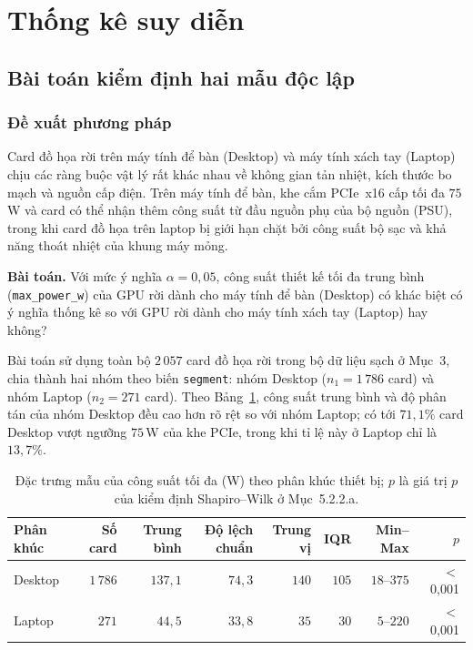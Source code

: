 \documentclass[12pt, a4paper]{article}
\begin{document}
\setcounter{section}{4}
\section{Thống kê suy diễn}
\setcounter{subsection}{1}
\subsection{Bài toán kiểm định hai mẫu độc lập}

\subsubsection{Đề xuất phương pháp}
Card đồ họa rời trên máy tính để bàn (Desktop) và máy tính xách tay (Laptop) chịu các ràng buộc vật lý rất khác nhau về không gian tản nhiệt, kích thước bo mạch và nguồn cấp điện. Trên máy tính để bàn, khe cắm PCIe~x16 cấp tối đa $75$\,W và card có thể nhận thêm công suất từ đầu nguồn phụ của bộ nguồn (PSU), trong khi card đồ họa trên laptop bị giới hạn chặt bởi công suất bộ sạc và khả năng thoát nhiệt của khung máy mỏng.

\textbf{Bài toán.} Với mức ý nghĩa $\alpha = 0{,}05$, công suất thiết kế tối đa trung bình (\texttt{max\_power\_w}) của GPU rời dành cho máy tính để bàn (Desktop) có khác biệt có ý nghĩa thống kê so với GPU rời dành cho máy tính xách tay (Laptop) hay không?

Bài toán sử dụng toàn bộ $2\,057$ card đồ họa rời trong bộ dữ liệu sạch ở Mục~3, chia thành hai nhóm theo biến \texttt{segment}: nhóm Desktop ($n_1 = 1\,786$ card) và nhóm Laptop ($n_2 = 271$ card). Theo Bảng~\ref{tab:two_sample_groups}, công suất trung bình và độ phân tán của nhóm Desktop đều cao hơn rõ rệt so với nhóm Laptop; có tới $71{,}1\%$ card Desktop vượt ngưỡng $75$\,W của khe PCIe, trong khi tỉ lệ này ở Laptop chỉ là $13{,}7\%$.

\begin{table}[H]
  \centering
  \caption{Đặc trưng mẫu của công suất tối đa (W) theo phân khúc thiết bị; $p$ là giá trị $p$ của kiểm định Shapiro--Wilk ở Mục~5.2.2.a.}
  \label{tab:two_sample_groups}
  \begin{tabular}{lrrrrrrr}
    \toprule
    Phân khúc & Số card & Trung bình & Độ lệch chuẩn & Trung vị & IQR & Min--Max & $p$ \\
    \midrule
    Desktop & $1\,786$ & $137{,}1$ & $74{,}3$ & $140$ & $105$ & $18$--$375$ & $<$ 0,001 \\
    Laptop  & $271$    & $44{,}5$  & $33{,}8$ & $35$  & $30$  & $5$--$220$  & $<$ 0,001 \\
    \bottomrule
  \end{tabular}
\end{table}
\end{document}
